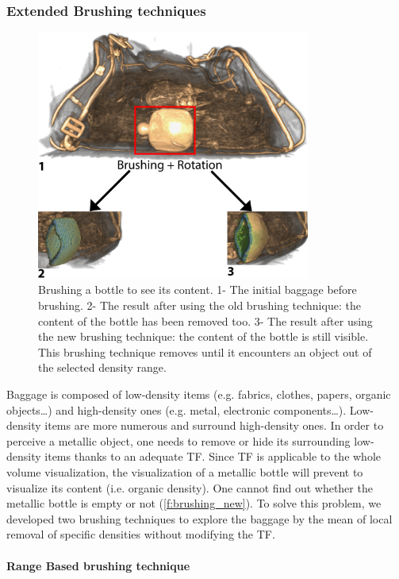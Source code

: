 \subsubsection{Extended Brushing techniques}

\begin{figure}
\centering   	\includegraphics[width=9cm]{Figures/brushing-new.png}
	\caption[Brushing a bottle to see its content.]{ Brushing a bottle to see its content.  1- The initial baggage before brushing. 2- The result after using the old brushing technique: the content of the bottle has been removed too. 3- The result after using the new brushing technique: the content of the bottle is still visible. This brushing technique removes until it encounters an object out of the selected density range. }
	\label{f:brushing_new}
\end{figure}

Baggage is composed of low-density items (e.g. fabrics, clothes, papers, organic objects…) and high-density ones (e.g. metal, electronic components…). Low-density items are more numerous and surround high-density ones. In order to perceive a metallic object, one needs to remove or hide its surrounding low-density items thanks to an adequate TF. Since TF is applicable to the whole volume visualization, the visualization of a metallic bottle will prevent to visualize its content (i.e. organic density). One cannot find out whether the metallic bottle is empty or not (\autoref{f:brushing_new}). To solve this problem, we developed two brushing techniques to explore the baggage by the mean of local removal of specific densities without modifying the TF.

\paragraph{Range Based brushing technique}


